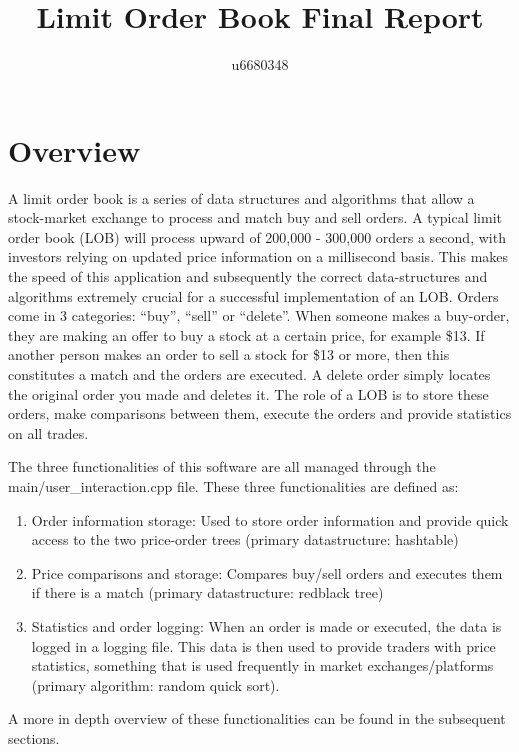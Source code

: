 \documentclass[11p]{article}
\begin{document}
	
	\title{Limit Order Book Final Report}
	\author{u6680348}
	
    
    \maketitle

 
\section{Overview}
A limit order book is a series of data structures and algorithms that allow a stock-market exchange to process and match buy and sell orders. A typical limit order book (LOB) will process upward of 200,000 - 300,000 orders a second, with investors relying on updated price information on a millisecond basis. This makes the speed of this application and subsequently the correct data-structures and algorithms extremely crucial for a successful implementation of an LOB. Orders come in 3 categories:  “buy”, “sell” or “delete”.  When someone makes a buy-order, they are making an offer to buy a stock at a certain price, for example \$13.  If another person makes an order to sell a stock for \$13 or more, then this constitutes a match and the orders are executed.  A delete order simply locates the original order you made and deletes it.  The role of a LOB is to store these orders, make comparisons between them, execute the orders and provide statistics on all trades.   \bigbreak

The three functionalities of this software are all managed through the main/user\_interaction.cpp file. These three functionalities are defined as:
\begin{enumerate}
    \item Order information storage: Used to store order information and provide quick access to the two price-order trees (primary datastructure: hashtable)
    \item Price comparisons and storage: Compares buy/sell orders and executes them if there is a match (primary datastructure: redblack tree)
    \item Statistics and order logging: When an order is made or executed, the data is logged in a logging file. This data is then used to provide traders with price statistics, something that is used frequently in market exchanges/platforms (primary algorithm: random quick sort).
\end{enumerate}
A more in depth overview of these functionalities can be found in the subsequent sections.
\end{document}
